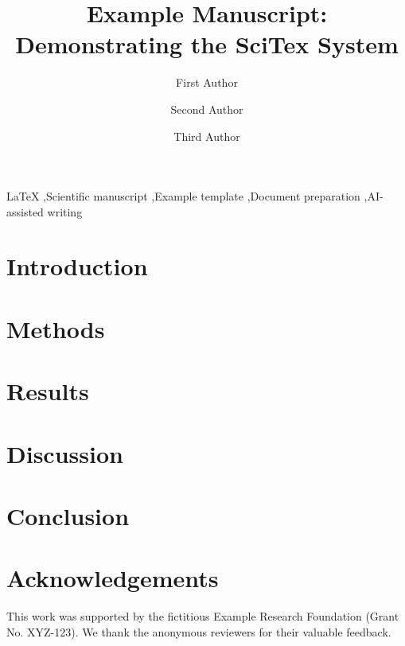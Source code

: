 \documentclass[final,5p,times]{elsarticle}
\title{Example Manuscript: Demonstrating the SciTex System}
\author[1]{First Author\corref{cor1}}
\author[1,2]{Second Author}
\author[3]{Third Author}
\begin{document}
\maketitle

\begin{abstract}

\end{abstract}

\begin{keyword}
LaTeX \sep Scientific manuscript \sep Example template \sep Document preparation \sep AI-assisted writing
\end{keyword}

\section{Introduction}
\label{sec:introduction}


\section{Methods}
\label{sec:methods}


\section{Results}
\label{sec:results}


\section{Discussion}
\label{sec:discussion}


\section{Conclusion}
\label{sec:conclusion}


\section*{Acknowledgements}
This work was supported by the fictitious Example Research Foundation (Grant No. XYZ-123). We thank the anonymous reviewers for their valuable feedback.







\end{document}
